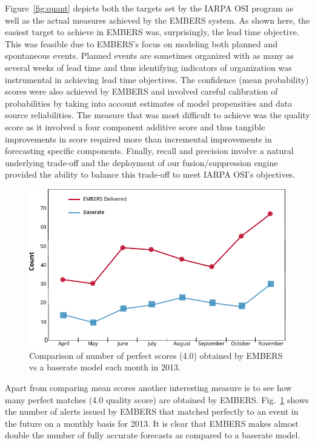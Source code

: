 Figure~\ref{fig:quant} depicts both the targets set by the IARPA OSI program as well as the
actual measures achieved by the EMBERS system. As shown here, the easiest target to achieve
in EMBERS was, surprisingly, the lead time objective. This was feasible due to EMBERS's focus on modeling
both planned and spontaneous events. Planned events are sometimes organized with as many as several weeks
of lead time and thus identifying indicators of organization was instrumental in achieving
lead time objectives. The confidence (mean probability) scores were also achieved by EMBERS and involved
careful calibration of probabilities by taking into account estimates of
model propensities and data source reliabilities. The measure that was most difficult to achieve
was the quality score as it involved a four component additive score and thus tangible improvements in
score required more than incremental improvements in forecasting specific components. Finally, recall
and precision involve a natural underlying trade-off and the deployment of our fusion/suppression
engine provided the ability to balance this trade-off to meet IARPA OSI's objectives.
\begin{figure}
  \centering
\includegraphics[width=0.85\columnwidth]{figures/cu/perf_figures.pdf}
\caption{Comparison of number of perfect scores (4.0) obtained by EMBERS vs
a baserate model each month in 2013.}
\label{fig:perfect_score}
\end{figure}
Apart from comparing mean scores another interesting measure is to see
how many perfect matches (4.0 quality score) are obtained by EMBERS.
Fig.~\ref{fig:perfect_score} shows the number of alerts issued
by EMBERS that matched perfectly to an event in the future on a monthly
basis for 2013.  It is clear that EMBERS makes almost double
the number of fully accurate forecasts as compared to a baserate
model.

